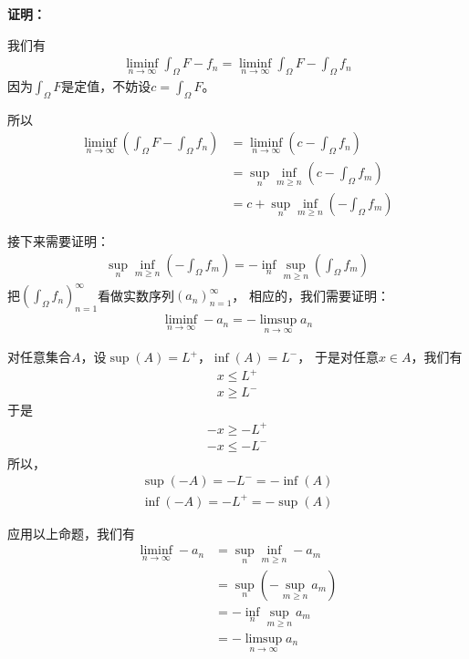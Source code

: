 \documentclass{article}
\begin{document}
\textbf{证明：}

我们有
\begin{align*}
  \liminf\limits_{n \to \infty} \int_{\Omega} F - f_n
  = \liminf\limits_{n \to \infty} \int_{\Omega} F - \int_{\Omega} f_n
\end{align*}
因为$\int_{\Omega} F$是定值，不妨设$c = \int_{\Omega} F$。

所以
\begin{align*}
  \liminf\limits_{n \to \infty} \left(\int_{\Omega} F - \int_{\Omega} f_n\right)
   & = \liminf\limits_{n \to \infty} \left( c - \int_{\Omega} f_n \right)            \\
   & = \sup\limits_{n} \inf\limits_{m \geq  n} \left( c - \int_{\Omega} f_m \right)  \\
   & = c + \sup\limits_{n} \inf\limits_{m \geq  n} \left(- \int_{\Omega} f_m \right)
\end{align*}

接下来需要证明：
\begin{align*}
  \sup\limits_{n} \inf\limits_{m \geq  n} \left(- \int_{\Omega} f_m \right)
  = - \inf\limits_{n} \sup\limits_{m \geq  n} \left(\int_{\Omega} f_m \right)
\end{align*}
把$(\int_{\Omega} f_n)_{n = 1}^\infty$看做实数序列$(a_n)_{n = 1}^\infty$，
相应的，我们需要证明：
\begin{align*}
  \liminf\limits_{n \to \infty} - a_n = - \limsup\limits_{n \to \infty} a_n
\end{align*}

对任意集合$A$，设$\sup(A) = L^+$，$\inf(A) = L^-$，
于是对任意$x \in A$，我们有
\begin{align*}
  x \leq L^+ \\
  x \geq L^-
\end{align*}
于是
\begin{align*}
  -x \geq -L^+ \\
  -x \leq -L^-
\end{align*}
所以，
\begin{align*}
  \sup(-A) = -L^- = - \inf(A) \\
  \inf(-A) = -L^+ = - \sup(A)
\end{align*}

应用以上命题，我们有
\begin{align*}
  \liminf\limits_{n \to \infty} - a_n
   & = \sup\limits_{n}\inf\limits_{m \geq n} - a_m   \\
   & = \sup\limits_{n}(- \sup\limits_{m \geq n} a_m) \\
   & = - \inf\limits_{n}\sup\limits_{m \geq n} a_m   \\
   & = - \limsup\limits_{n \to \infty} a_n
\end{align*}
\end{document}
